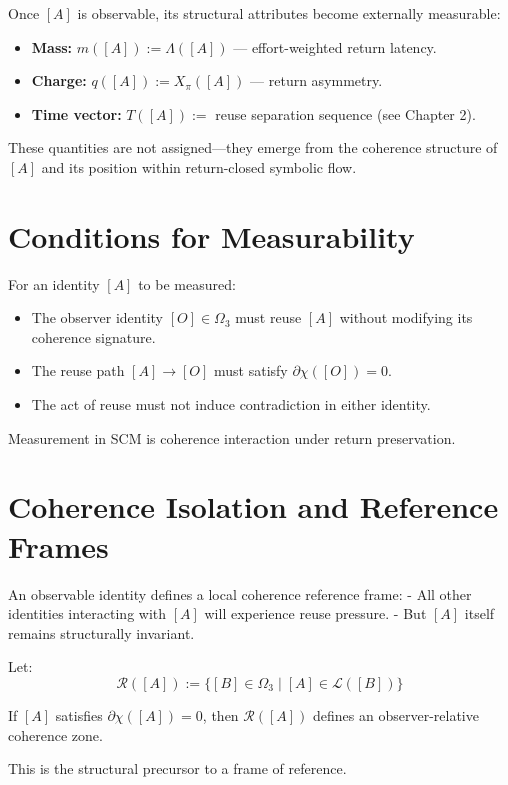 Once $[A]$ is observable, its structural attributes become externally measurable:

\begin{itemize}
    \item \textbf{Mass:} $m([A]) := \Lambda([A])$ — effort-weighted return latency.
    \item \textbf{Charge:} $q([A]) := X_\pi([A])$ — return asymmetry.
    \item \textbf{Time vector:} $T([A]) :=$ reuse separation sequence (see Chapter 2).
\end{itemize}

These quantities are not assigned—they emerge from the coherence structure of $[A]$ and its position within return-closed symbolic flow.

\section{Conditions for Measurability} \label{sec:measurability}

For an identity $[A]$ to be measured:
\begin{itemize}
    \item The observer identity $[O] \in \Omega_3$ must reuse $[A]$ without modifying its coherence signature.
    \item The reuse path $[A] \to [O]$ must satisfy $\partial\chi([O]) = 0$.
    \item The act of reuse must not induce contradiction in either identity.
\end{itemize}

Measurement in SCM is coherence interaction under return preservation.

\section{Coherence Isolation and Reference Frames} \label{sec:reference-frames}

An observable identity defines a local coherence reference frame:
- All other identities interacting with $[A]$ will experience reuse pressure.
- But $[A]$ itself remains structurally invariant.

Let:
\[
\mathcal{R}([A]) := \{ [B] \in \Omega_3 \mid [A] \in \mathcal{L}([B]) \}
\]

If $[A]$ satisfies $\partial\chi([A]) = 0$, then $\mathcal{R}([A])$ defines an observer-relative coherence zone.

This is the structural precursor to a frame of reference.

